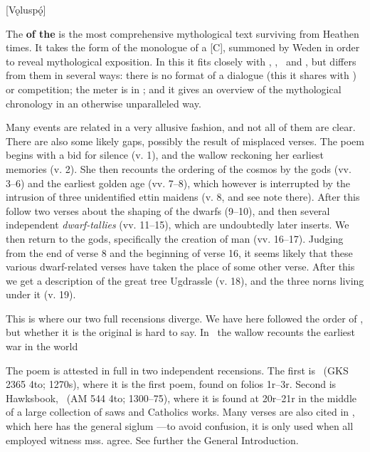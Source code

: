 [Vǫluspǫ́]


The \textbf{ of the } is the most comprehensive mythological text surviving from Heathen times. It takes the form of the monologue of a [C], summoned by Weden in order to reveal mythological exposition. In this it fits closely with \Vafthrudnismal, \Grimnismal, \Sigrdrifumal\ and \Allvismal, but differs from them in several ways: there is no format of a dialogue (this it shares with \Grimnismal) or competition; the meter is in \Fornyrdislag; and it gives an overview of the mythological chronology in an otherwise unparalleled way.

Many events are related in a very allusive fashion, and not all of them are clear. There are also some likely gaps, possibly the result of misplaced verses. The poem begins with a bid for silence (v. 1), and the wallow reckoning her earliest memories (v. 2). She then recounts the ordering of the cosmos by the gods (vv. 3–6) and the earliest golden age (vv. 7–8), which however is interrupted by the intrusion of three unidentified ettin maidens (v. 8, and see note there). After this follow two verses about the shaping of the dwarfs (9–10), and then several independent \emph{dwarf-tallies} (vv. 11–15), which are undoubtedly later inserts. We then return to the gods, specifically the creation of man (vv. 16–17). Judging from the end of verse 8 and the beginning of verse 16, it seems likely that these various dwarf-related verses have taken the place of some other verse. After this we get a description of the great tree Ugdrassle (v. 18), and the three norns living under it (v. 19).

This is where our two full recensions diverge. We have here followed the order of \Regius, but whether it is the original is hard to say. In \Regius\ the wallow recounts the earliest war in the world %

The poem is attested in full in two independent recensions. The first is \Regius\ (GKS 2365 4to; 1270s), where it is the first poem, found on folios 1r–3r. Second is Hawksbook, \Hauksbok\ (AM 544 4to; 1300–75), where it is found at 20r–21r in the middle of a large collection of saws and Catholics works. Many verses are also cited in \Gylfaginning, which here has the general siglum \GylfMS—to avoid confusion, it is only used when all employed witness mss. agree. See further the General Introduction. %

